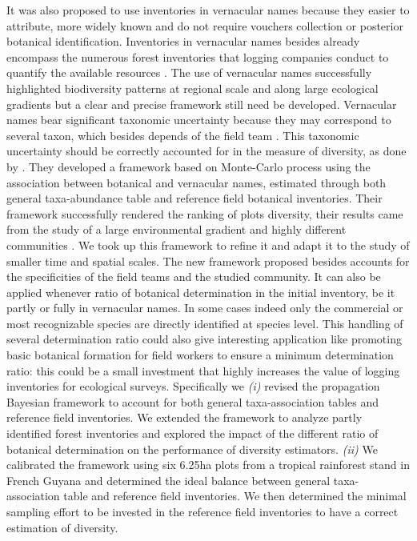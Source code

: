 \documentclass[fleqn,10pt]{ArtEcoFoG} %
\begin{document}
It was also proposed to use inventories in vernacular names because they
easier to attribute, more widely known and do not require vouchers
collection or posterior botanical identification. Inventories in
vernacular names besides already encompass the numerous forest
inventories that logging companies conduct to quantify the available
resources
\citep{TerSteege2006, Feldpausch2006, Rejou-Mechain2008, Rejou-Mechain2011}.
The use of vernacular names successfully highlighted biodiversity
patterns at regional scale and along large ecological gradients
\citep{Guitet2014b} but a clear and precise framework still need be
developed. Vernacular names bear significant taxonomic uncertainty
because they may correspond to several taxon, which besides depends of
the field team \citep{Oldeman1968}. This taxonomic uncertainty should be
correctly accounted for in the measure of diversity, as done by
\citet{Guitet2014b}. They developed a framework based on Monte-Carlo
process using the association between botanical and vernacular names,
estimated through both general taxa-abundance table \citep{De2009} and
reference field botanical inventories. Their framework successfully
rendered the ranking of plots diversity, their results came from the
study of a large environmental gradient and highly different communities
\citep{Guitet2014b, Guitet2013}. We took up this framework to refine it
and adapt it to the study of smaller time and spatial scales. The new
framework proposed besides accounts for the specificities of the field
teams and the studied community. It can also be applied whenever ratio
of botanical determination in the initial inventory, be it partly or
fully in vernacular names. In some cases indeed only the commercial or
most recognizable species are directly identified at species level. This
handling of several determination ratio could also give interesting
application like promoting basic botanical formation for field workers
to ensure a minimum determination ratio: this could be a small
investment that highly increases the value of logging inventories for
ecological surveys. Specifically we \emph{(i)} revised the propagation
Bayesian framework to account for both general taxa-association tables
and reference field inventories. We extended the framework to analyze
partly identified forest inventories and explored the impact of the
different ratio of botanical determination on the performance of
diversity estimators. \emph{(ii)} We calibrated the framework using six
6.25ha plots from a tropical rainforest stand in French Guyana and
determined the ideal balance between general taxa-association table and
reference field inventories. We then determined the minimal sampling
effort to be invested in the reference field inventories to have a
correct estimation of diversity.
\end{document}
